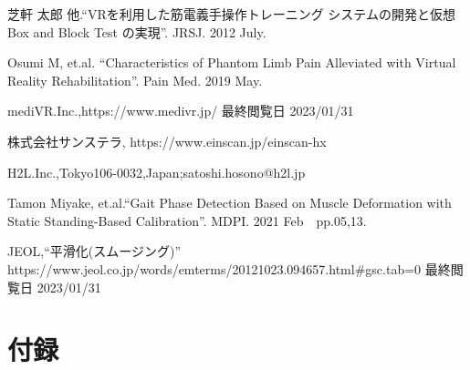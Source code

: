 \documentclass{ltjsreport}
\begin{document}
\begin{thebibliography}{99}

	芝軒 太郎 他.``VRを利用した筋電義手操作トレーニング
	システムの開発と仮想 Box and Block Test の実現''.
	JRSJ. 2012 July.

	Osumi M, et.al.
	``Characteristics of Phantom Limb Pain Alleviated
	with Virtual Reality Rehabilitation''.
	Pain Med. 2019 May.

	mediVR.Inc.,https://www.medivr.jp/
	最終閲覧日 2023/01/31


	株式会社サンステラ, https://www.einscan.jp/einscan-hx
	
	
	
	H2L.Inc.,Tokyo106-0032,Japan;satoshi.hosono@h2l.jp
	


	Tamon Miyake, et.al.``Gait Phase Detection Based on Muscle Deformation
	with Static Standing-Based Calibration''.
	MDPI. 2021 Feb　pp.05,13.


	JEOL,``平滑化(スムージング)''\\
	https://www.jeol.co.jp/words/emterms/20121023.094657.html\#gsc.tab=0
	最終閲覧日 2023/01/31

\end{thebibliography}
\chapter*{付録}

\end{document}
